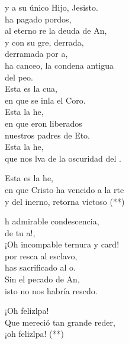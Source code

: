 \begin{cancion}
	y a su único Hijo, Jesisto.\\
	 ha pagado pordos,\\
	al eterno re la deuda de An,\\
	y con su gre, derrada,\\
	derramada por a,\\
	ha canceo, la condena antigua\\
	del peo.\\
	Esta es la cua,\\
	en que se inla el Coro.\\
	Esta  la he,\\
	en que eron liberados\\
	nuestros padres de Eto.\\
	Esta  la he,\\
	que nos lva de la oscuridad del .\\
	\begin{chorus}%
	Esta es la he,\\
	en que Cristo ha vencido a la rte\\
	y del inerno, retorna victoso (**)\\
	\end{chorus}%
	h admirable condescencia,\\
	de tu a!,\\
	¡Oh incompable ternura y card!\\
	por resca al esclavo,\\
	has sacrificado al o.\\
	Sin el pecado de An,\\
	isto no nos habría rescdo.\\
	\begin{chorus}%
	¡Oh felizlpa!\\
	Que mereció tan grande reder,\\
	¡oh felizlpa! (**)\\

\end{chorus}
\end{cancion}
